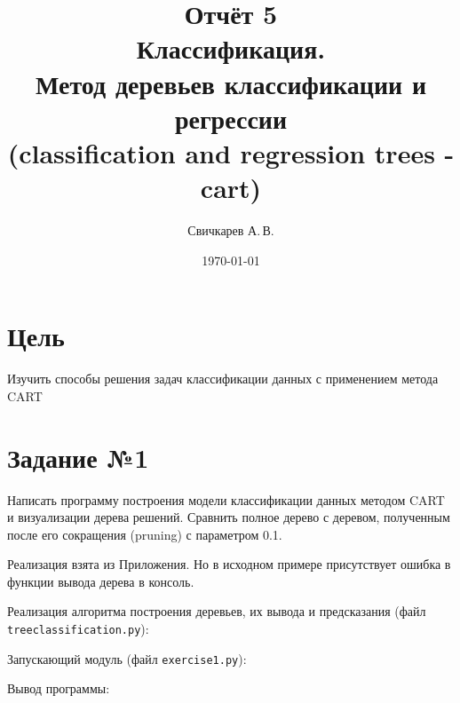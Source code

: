 \documentclass{article} %
\title{Отчёт 5\protect\\
    Классификация.\\
    Метод деревьев классификации и регрессии\\
    (classification and regression trees - cart)} %
\author{Свичкарев А.\,В.} %
\date{\today} %
\begin{document}

\maketitle %

\section{Цель}
Изучить способы решения задач классификации данных с
применением метода CART

\section{Задание №1}
Написать программу построения модели классификации данных методом CART и
визуализации дерева решений. Сравнить полное дерево с деревом, полученным после его
сокращения (pruning) с параметром 0.1.
\bigskip

Реализация взята из Приложения.
Но в исходном примере присутствует ошибка в функции вывода дерева в консоль.
\bigskip

Реализация алгоритма построения деревьев,
их вывода и предсказания (файл \verb$treeclassification.py$):

\clearpage
Запускающий модуль (файл \verb$exercise1.py$):
\bigskip

Вывод программы:

\end{document}
